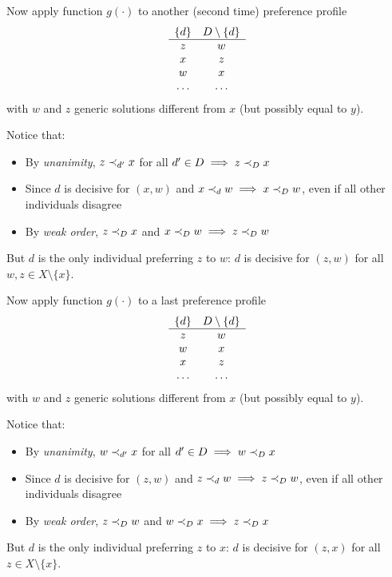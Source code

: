Now apply function $g (\cdot)$ to another (second time) preference profile 
$$
\begin{array}{c c}
	\{d\} & D \setminus \{d\} \\
	\hline
	z & w \\
	x & z \\
	w & x \\
	\dots & \dots
\end{array}
$$
with $w$ and $z$ generic solutions different from $x$ (but possibly equal to $y$).

Notice that: 
\begin{itemize}
	\item By \textit{unanimity}, $z \prec_{d'} x$ for all $d' \in D \implies z \prec_{D} x$
	
	\item Since $d$ is decisive for $(x,w)$ and $x \prec_{d} w \implies x \prec_{D} w$, even if all other individuals disagree
	
	\item By \textit{weak order}, $z \prec_{D} x$ and $x \prec_{D} w \implies z \prec_{D} w$
\end{itemize}

But $d$ is the only individual preferring $z$ to $w$: $d$ is decisive for $(z, w)$ for all $w, z \in X \setminus \{x\}$.

Now apply function $g (\cdot)$ to a last preference profile 
$$
\begin{array}{c c}
	\{d\} & D \setminus \{d\} \\
	\hline
	z & w \\
	w & x \\
	x & z \\
	\dots & \dots
\end{array}
$$
with $w$ and $z$ generic solutions different from $x$ (but possibly equal to $y$).

Notice that: 
\begin{itemize}
	\item By \textit{unanimity}, $w \prec_{d'} x$ for all $d' \in D \implies w \prec_{D} x$
	
	\item Since $d$ is decisive for $(z,w)$ and $z \prec_{d} w \implies z \prec_{D} w$, even if all other individuals disagree
	
	\item By \textit{weak order}, $z \prec_{D} w$ and $w \prec_{D} x \implies z \prec_{D} x$
\end{itemize}

But $d$ is the only individual preferring $z$ to $x$: $d$ is decisive for $(z, x)$ for all $z \in X \setminus \{x\}$.

